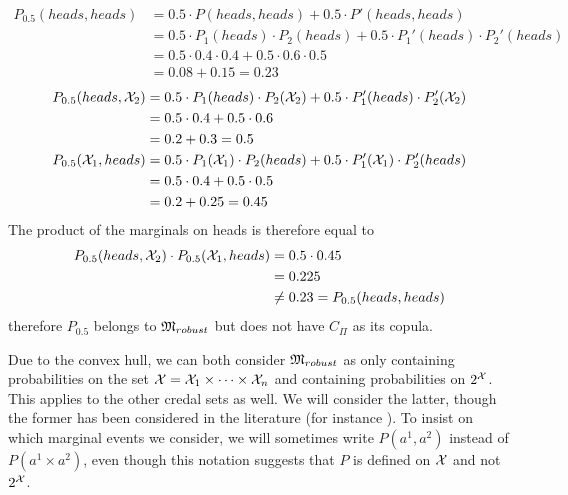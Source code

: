 \begin{example}
\begin{align*}
    P_{0.5}(heads, heads) &= 0.5\cdot P(heads, heads)+0.5\cdot P'(heads, heads)\\
    &= 0.5\cdot P_1(heads)\cdot P_2(heads)+0.5\cdot P_1'(heads)\cdot P_2'(heads)\\
    &= 0.5\cdot 0.4\cdot 0.4+0.5\cdot 0.6\cdot 0.5\\
    &=0.08+0.15 = 0.23
\end{align*}
\begin{align*}
    P_{0.5}(heads, \mathcal{X}_2) &= 0.5\cdot P_1(heads)\cdot P_2(\mathcal{X}_2) + 0.5\cdot P_1'(heads)\cdot P_2'(\mathcal{X}_2)\\
    &= 0.5\cdot 0.4 + 0.5\cdot 0.6\\
    &= 0.2+0.3 = 0.5\\
    P_{0.5}(\mathcal{X}_1, heads) &= 0.5\cdot P_1(\mathcal{X}_1)\cdot P_2(heads) + 0.5\cdot P_1'(\mathcal{X}_1)\cdot P_2'(heads)\\
    &= 0.5\cdot 0.4 + 0.5\cdot 0.5\\
    &= 0.2+0.25 = 0.45
\end{align*}
The product of the marginals on heads is therefore equal to
\begin{align*}
    P_{0.5}(heads, \mathcal{X}_2)\cdot P_{0.5}(\mathcal{X}_1, heads)&= 0.5\cdot0.45\\
    &=0.225\\
    &\neq 0.23 = P_{0.5}(heads, heads)
\end{align*}
therefore $P_{0.5}$ belongs to $\mathfrak{M}_{robust}$ but does not have $C_\Pi$ as its copula.
\end{example}

\begin{remark}
	Due to the convex hull, we can both consider $\mathfrak{M}_{robust}$ as only containing probabilities on the set $\mathcal{X}=\mathcal{X}_1\times\dots\times\mathcal{X}_n$ and containing probabilities on $2^{\mathcal{X}}$. This applies to the other credal sets as well. We will consider the latter, though the former has been considered in the literature (for instance \cite{schmelzer_characterizing_2012, schmelzer_random_2023}). To insist on which marginal events we consider, we will sometimes write $P(a^1, a^2)$ instead of $P(a^1\times a^2)$, even though this notation suggests that $P$ is defined on $\mathcal{X}$ and not $2^{\mathcal{X}}$. 
\end{remark}

